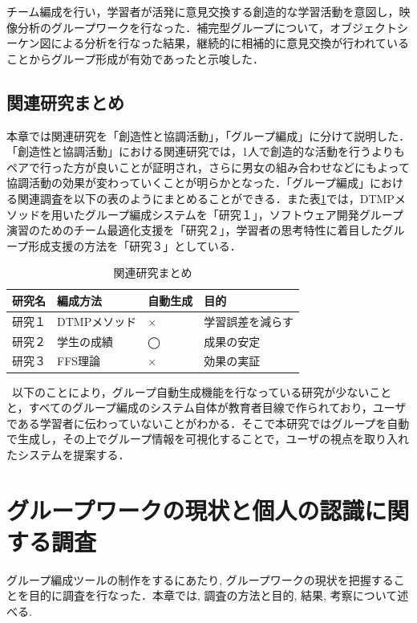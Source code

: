 \documentclass{funthesis}
\begin{document}
チーム編成を行い，学習者が活発に意見交換する創造的な学習活動を意図し，映像分析のグループワークを行なった．補完型グループについて，オブジェクトシーケン図による分析を行なった結果，継続的に相補的に意見交換が行われていることからグループ形成が有効であったと示唆した．



\section{関連研究まとめ}
本章では関連研究を「創造性と協調活動」，「グループ編成」に分けて説明した．「創造性と協調活動」における関連研究では，1人で創造的な活動を行うよりもペアで行った方が良いことが証明され，さらに男女の組み合わせなどにもよって協調活動の効果が変わっていくことが明らかとなった．「グループ編成」における関連調査を以下の表のようにまとめることができる．また表\ref{関連まとめ}では，DTMPメソッドを用いたグループ編成システムを「研究１」，ソフトウェア開発グループ演習のためのチーム最適化支援を「研究２」，学習者の思考特性に着目したグループ形成支援の方法を「研究３」としている．
\begin{table}[h]
\begin{center}
  \caption{関連研究まとめ}
  
  \begin{tabular}{llll} \hline
    研究名 & 編成方法 & 自動生成 & 目的\tabularnewline \hline
    研究１& DTMPメソッド & × & 学習誤差を減らす\tabularnewline
    研究２&学生の成績 &◯&成果の安定\tabularnewline
    研究３&FFS理論&× & 効果の実証\tabularnewline
     \hline
  \end{tabular}
  \label{関連まとめ}
  \end{center}
\end{table}



\ 以下のことにより，グループ自動生成機能を行なっている研究が少ないことと，すべてのグループ編成のシステム自体が教育者目線で作られており，ユーザである学習者に伝わっていないことがわかる．そこで本研究ではグループを自動で生成し，その上でグループ情報を可視化することで，ユーザの視点を取り入れたシステムを提案する．
\chapter{グループワークの現状と個人の認識に関する調査}

グループ編成ツールの制作をするにあたり,  グループワークの現状を把握することを目的に調査を行なった．本章では,  調査の方法と目的,  結果,  考察について述べる.
\end{document}
